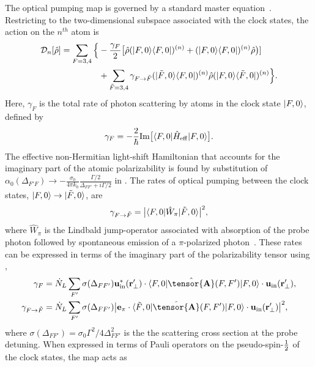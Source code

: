 \documentclass[preprint, aps,pra,onecolumn]{revtex4-1} %
\newcommand{\half}{\smallfrac{1}{2}}
\newcommand{\inp}{{\rm in}}
\newcommand{\charpol}{\alpha_0(\Delta_{F'F})}
\begin{document}
The optical pumping map is governed by a standard master equation~\cite{deutsch_quantum_2010}.  
Restricting to the two-dimensional subspace associated with the clock states, the action on the $n^{th}$ atom is
	\begin{align}
		\mathcal{D}_n[\hat{\rho}] =  \sum_{F=3,4} \Big\{& -\frac{\gamma_{F}}{2} \big[ \hat{\rho} (\lvert{F,0}\rangle\langle{F,0}\rvert)^{(n)} + (\lvert{F,0}\rangle\langle{F,0}\rvert)^{(n)}\hat{\rho} \big)]\\
		&+  \sum_{\tilde{F} =3,4}  \gamma_{F \rightarrow \tilde{F}}(\lvert{\tilde{F},0}\rangle\langle{F,0}\rvert)^{(n)} \hat{\rho}(\lvert{F,0}\rangle\langle{\tilde{F},0}\rvert)^{(n)} \Big\}.\nonumber
	\end{align}
Here, $\gamma_{F}$ is the total rate of photon scattering by atoms in the clock state $\lvert{F,0}\rangle$, defined by
	\begin{equation}
		\gamma_{F}=- \frac{2}{\hbar} {\rm Im} \big[ \langle{F,0}\rvert \hat{H}_{\rm eff}\lvert{F,0}\rangle \big] .
	\end{equation}
The effective non-Hermitian light-shift Hamiltonian that accounts for the imaginary part of the atomic polarizability is found by substitution of $\charpol \rightarrow -\frac{\sigma_0}{4\pi k_0}\frac{\Gamma/2}{\Delta_{FF'}+i\Gamma/2}$ in .  The rates of optical pumping between the clock states, $\lvert{F,0}\rangle \rightarrow \lvert{\tilde{F},0}\rangle$, are
	\begin{equation}
		\gamma_{F \rightarrow \tilde{F} } =\big| \langle{F,0}\rvert \hat{W}_\pi \lvert{\tilde{F},0}\rangle \big|^2,
	\end{equation}
where $\hat{W}_\pi$ is the Lindbald jump-operator associated with absorption of the probe photon followed by spontaneous emission of a $\pi$-polarized photon~\cite{deutsch_quantum_2010}.  These rates can be expressed in terms of the imaginary part of the polarizability tensor using ,
	\begin{align}
		\gamma_F &=\dot{N}_L  \sum_{F'} \sigma (\Delta_{FF'} ) \mathbf{u}^*_\inp(\br'_\perp)\cdot \bra{F,0} \hat{\tensor{\mbf{A}}}(F,F') \ket{F,0}  \cdot \mathbf{u}_\inp(\br'_\perp), \\
		\gamma_{F \rightarrow \tilde{F}}&=  \dot{N}_L  \sum_{F'} \sigma (\Delta_{FF'}) \big| \mathbf{e}_\pi\cdot \bra{\tilde{F},0} \hat{\tensor{\mbf{A}}}(F,F') \ket{F,0}  \cdot \mathbf{u}_\inp(\br'_\perp) \big|^2 ,
	\end{align}
where $ \sigma (\Delta_{FF'} )  = \sigma_0 \Gamma^2/4\Delta^2_{FF'}$ is the the scattering cross section at the probe detuning. When expressed in terms of Pauli operators on the pseudo-spin-$\half$ of the clock states, the map acts as
\end{document}
